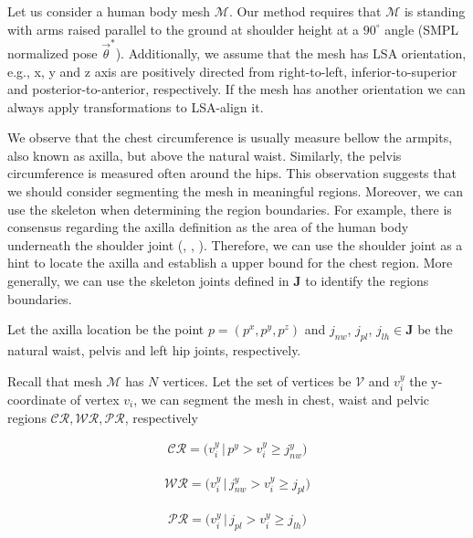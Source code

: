 \documentclass[runningheads, orivec]{llncs}
\begin{document}
Let us consider a human body mesh $\mathcal{M}$. Our method requires that 
$\mathcal{M}$ is standing with arms raised 
parallel to the 
ground at shoulder height at a $90^\circ$ angle (SMPL normalized pose
$\vec{\theta}^*$). Additionally, we assume that the mesh 
has LSA orientation, e.g., x, y and z axis are positively directed from 
right-to-left, inferior-to-superior and posterior-to-anterior, respectively. If 
the mesh has another orientation we can always apply transformations to 
LSA-align it.

We observe that the chest circumference is usually measure bellow the armpits, 
also 
known as axilla, but above the natural waist. Similarly, the pelvis 
circumference is measured often around the hips. This observation suggests that 
we should consider segmenting the mesh in meaningful regions. Moreover, we can 
use the skeleton when determining the region boundaries. For 
example, there is consensus regarding the axilla 
definition as the area of the human body underneath the shoulder joint 
(\cite{MeSH.axilla}, \cite{FMA.axilla}, \cite{TA.axilla}). Therefore, we can 
use the shoulder joint as a hint to locate the axilla and establish a upper 
bound for the chest region. More generally, we can use the 
skeleton joints defined in $\mathbf{J}$ to identify the regions boundaries.

Let the axilla location be the point $p = (p^x, p^y, p^z)$ and 
$j_{nw}$, $j_{pl}$, 
$j_{lh} \in \mathbf{J}$ be the natural waist, pelvis and left hip joints, 
respectively.

Recall that mesh $\mathcal{M}$ has $N$ vertices. Let the set of vertices be 
$\mathcal{V}$ and $v^y_i$ the y-coordinate of vertex $v_i$, we can 
segment the 
mesh in chest, waist and pelvic regions 
$\mathcal{CR}, \mathcal{WR}, \mathcal{PR}$, respectively

\begin{align}\label{eq:cr}
\mathcal{CR} = \big(v^y_i \, | \, p^y > v^y_i \geq j^y_{nw} \big)
\end{align}

\begin{align}\label{eq:wr}
\mathcal{WR} = \big(v^y_i \, | \, j^y_{nw} > v^y_i \geq j_{pl}\big)
\end{align}

\begin{align}\label{eq:pr}
\mathcal{PR} = \big(v^y_i \, | \, j_{pl} > v^y_i \geq j_{lh}\big)
\end{align}
\end{document}
